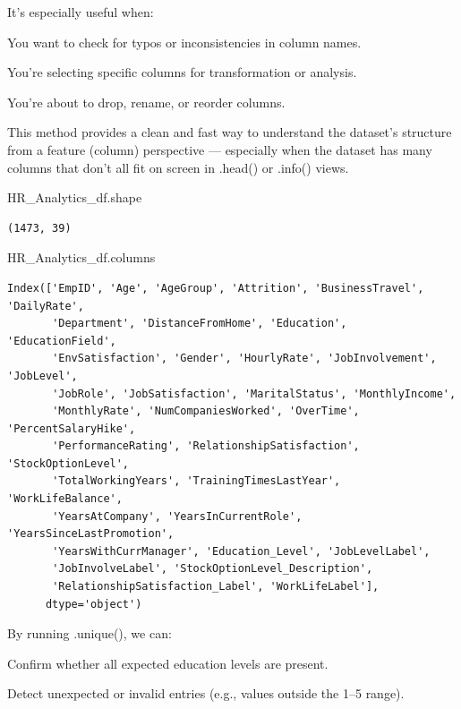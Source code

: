 \documentclass[
  letterpaper,
  DIV=11,
  numbers=noendperiod]{scrartcl}
\newenvironment{Shaded}{\begin{snugshade}}{\end{snugshade}}
\newcommand{\NormalTok}[1]{\textcolor[rgb]{0.00,0.23,0.31}{#1}}
\begin{document}
It's especially useful when:

You want to check for typos or inconsistencies in column names.

You're selecting specific columns for transformation or analysis.

You're about to drop, rename, or reorder columns.

This method provides a clean and fast way to understand the dataset's
structure from a feature (column) perspective --- especially when the
dataset has many columns that don't all fit on screen in .head() or
.info() views.

\begin{Shaded}
\begin{Highlighting}[]
\NormalTok{HR\_Analytics\_df.shape}
\end{Highlighting}
\end{Shaded}

\begin{verbatim}
(1473, 39)
\end{verbatim}

\begin{Shaded}
\begin{Highlighting}[]
\NormalTok{HR\_Analytics\_df.columns}
\end{Highlighting}
\end{Shaded}

\begin{verbatim}
Index(['EmpID', 'Age', 'AgeGroup', 'Attrition', 'BusinessTravel', 'DailyRate',
       'Department', 'DistanceFromHome', 'Education', 'EducationField',
       'EnvSatisfaction', 'Gender', 'HourlyRate', 'JobInvolvement', 'JobLevel',
       'JobRole', 'JobSatisfaction', 'MaritalStatus', 'MonthlyIncome',
       'MonthlyRate', 'NumCompaniesWorked', 'OverTime', 'PercentSalaryHike',
       'PerformanceRating', 'RelationshipSatisfaction', 'StockOptionLevel',
       'TotalWorkingYears', 'TrainingTimesLastYear', 'WorkLifeBalance',
       'YearsAtCompany', 'YearsInCurrentRole', 'YearsSinceLastPromotion',
       'YearsWithCurrManager', 'Education_Level', 'JobLevelLabel',
       'JobInvolveLabel', 'StockOptionLevel_Description',
       'RelationshipSatisfaction_Label', 'WorkLifeLabel'],
      dtype='object')
\end{verbatim}

By running .unique(), we can:

Confirm whether all expected education levels are present.

Detect unexpected or invalid entries (e.g., values outside the 1--5
range).
\end{document}
